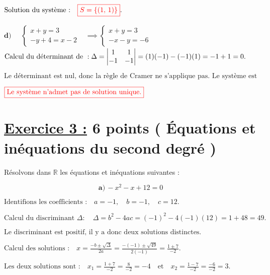 \documentclass[12pt,a4paper]{article}
\begin{document}
\(
\text{Solution du système :} \quad
\textcolor{red}{\boxed{S=\left\lbrace  \left( 1, \, 1 \right)  \right\rbrace }}.
\)

\(\textbf{d)} \quad
\begin{aligned}
\begin{cases}
x + y = 3 \\
-y + 4 = x - 2
\end{cases}&\implies
\begin{cases}
x + y = 3 \\
-x-y  = - 6
\end{cases}
\end{aligned}
\)\\

\(
\text{Calcul du déterminant de }: \\
\Delta = \left| \begin{matrix} 1 & 1 \\ -1 & -1 \end{matrix} \right| = (1)(-1) - (-1)(1) = -1 + 1 = 0.
\)

\(
\text{Le déterminant est nul, donc la règle de Cramer ne s'applique pas. Le système est soit impossible, soit indéterminé.}
\)

\(
\textcolor{red}{\boxed{\text{Le système n'admet pas de solution unique.}}}
\)

\section*{\underline{Exercice 3 :} 6 points ( Équations et inéquations du second degré )}

Résolvons dans \(\mathbb{R}\) les équations et inéquations suivantes :


\[ \textbf{a)} \, -x^2 - x + 12 = 0 \]

\(
\text{Identifions les coefficients :} \quad a = -1, \quad b = -1, \quad c = 12.
\)

\(
\text{Calcul du discriminant } \Delta : \quad
\Delta = b^2 - 4ac = (-1)^2 - 4(-1)(12) = 1 + 48 = 49.
\)

\(
\text{Le discriminant est positif, il y a donc deux solutions distinctes.}
\)

\(
\text{Calcul des solutions :} \quad
x = \frac{-b \pm \sqrt{\Delta}}{2a} = \frac{-(-1) \pm \sqrt{49}}{2(-1)} = \frac{1 \pm 7}{-2}.
\)

\(
\text{Les deux solutions sont :} \quad
x_1 = \frac{1 + 7}{-2} = \frac{8}{-2} = -4 \quad \text{et} \quad x_2 = \frac{1 - 7}{-2} = \frac{-6}{-2} = 3.
\)
\end{document}
